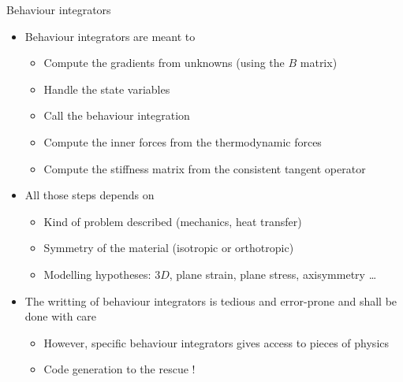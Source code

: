 \documentclass{beamer}
\begin{document}
\begin{frame}{Behaviour
    integrators}
  \begin{itemize}
    \item Behaviour integrators are meant to
    \begin{itemize}
      \item Compute the gradients from unknowns (using the
      \(B\) matrix)
      \item Handle the state variables
      \item Call the behaviour integration
      \item Compute the inner forces from the thermodynamic
      forces
      \item Compute the stiffness matrix from the consistent
      tangent operator
    \end{itemize}
  \end{itemize}
  \begin{itemize}
    \item All those steps depends on
    \begin{itemize}
      \item Kind of problem described (mechanics, heat
      transfer)
      \item Symmetry of the material (isotropic or
      orthotropic)
      \item Modelling hypotheses: \(3D\), plane strain,
      plane stress, axisymmetry \ldots
    \end{itemize}
  \end{itemize}
  \begin{itemize}
    \item The writting of behaviour integrators is tedious and
    error-prone and shall be done with care
    \begin{itemize}
      \item However, specific behaviour integrators gives
      access to pieces of physics
      \item Code generation to the rescue !
    \end{itemize}
  \end{itemize}
\end{frame}
\end{document}
